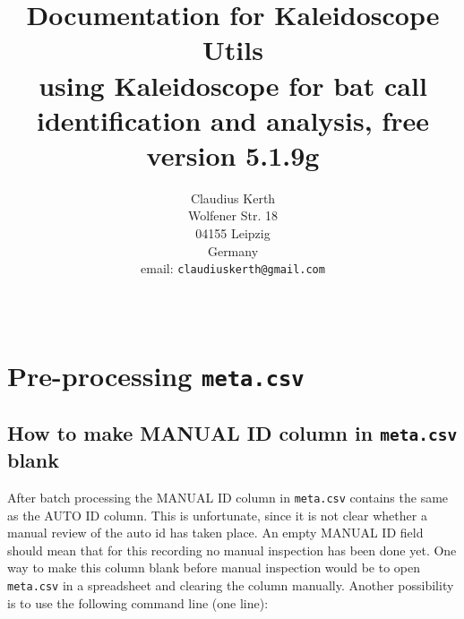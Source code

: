 \documentclass[English, 11pt, twoside, authoryear]{article}
\begin{document}
%
\title{ Documentation for \textsf{Kaleidoscope Utils}  \\
\vspace{20pt}
\normalsize{using \textsf{Kaleidoscope} for bat call identification and analysis, free version 5.1.9g}\vspace{100pt}}

%
%
\author{Claudius Kerth\\Wolfener Str. 18\\04155 Leipzig\\Germany\\email: \texttt{claudiuskerth@gmail.com}}
%
%
\date{~} %
%
%
%
%
%
%
\maketitle
%

\thispagestyle{empty} %
%
%
\tableofcontents %
%
%
\clearpage %
\setcounter{page}{1} %
%
%
%
%
%
\onecolumn


%
%
%
\section{Pre-processing \texttt{meta.csv}}

%
%
%
\subsection{How to make MANUAL ID column in \texttt{meta.csv} blank}
%
%
%
After batch processing the MANUAL ID column in \texttt{meta.csv} contains the same as the AUTO ID column. This is unfortunate, since it is not clear whether a manual review of the auto id has taken place. An empty MANUAL ID field should mean that for this recording no manual inspection has been done yet. One way to make this column blank before manual inspection would be to open \texttt{meta.csv} in a spreadsheet and clearing the column manually. Another possibility is to use the following command line (one line):
\end{document}

